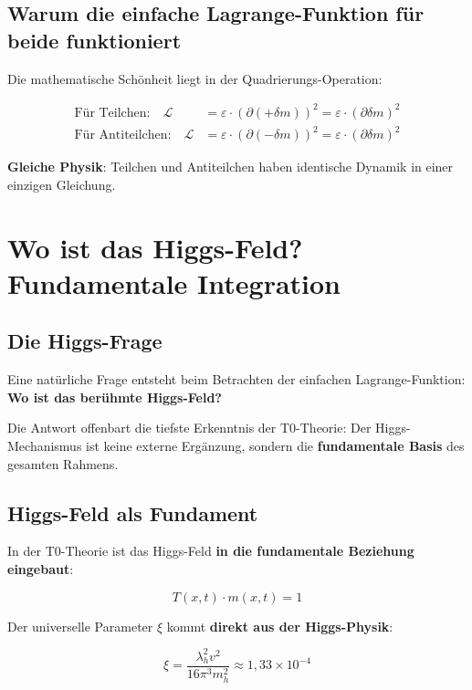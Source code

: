 \documentclass[12pt,a4paper]{article}
\newcommand{\Lag}{\mathcal{L}}
\newcommand{\deltam}{\delta m}
\newcommand{\xipar}{\xi}
\theoremstyle{definition}
\theoremstyle{remark}
\begin{document}
	\subsection{Warum die einfache Lagrange-Funktion für beide funktioniert}
	
	Die mathematische Schönheit liegt in der Quadrierungs-Operation:
	
	\begin{align}
		\text{Für Teilchen:} \quad \Lag &= \varepsilon \cdot (\partial (+\deltam))^2 = \varepsilon \cdot (\partial \deltam)^2 \\
		\text{Für Antiteilchen:} \quad \Lag &= \varepsilon \cdot (\partial (-\deltam))^2 = \varepsilon \cdot (\partial \deltam)^2
	\end{align}
	
	\textbf{Gleiche Physik}: Teilchen und Antiteilchen haben identische Dynamik in einer einzigen Gleichung.
	
	\section{Wo ist das Higgs-Feld? Fundamentale Integration}
	
	\subsection{Die Higgs-Frage}
	
	Eine natürliche Frage entsteht beim Betrachten der einfachen Lagrange-Funktion: \textbf{Wo ist das berühmte Higgs-Feld?}
	
	Die Antwort offenbart die tiefste Erkenntnis der T0-Theorie: Der Higgs-Mechanismus ist keine externe Ergänzung, sondern die \textbf{fundamentale Basis} des gesamten Rahmens.
	
	\subsection{Higgs-Feld als Fundament}
	
	In der T0-Theorie ist das Higgs-Feld \textbf{in die fundamentale Beziehung eingebaut}:
	
	\begin{equation}
		\boxed{T(x,t) \cdot m(x,t) = 1}
		\label{eq:higgs_foundation}
	\end{equation}
	
	Der universelle Parameter $\xipar$ kommt \textbf{direkt aus der Higgs-Physik}:
	
	\begin{equation}
		\boxed{\xipar = \frac{\lambda_h^2 v^2}{16\pi^3 m_h^2} \approx 1{,}33 \times 10^{-4}}
		\label{eq:xi_from_higgs}
	\end{equation}
	
\end{document}

